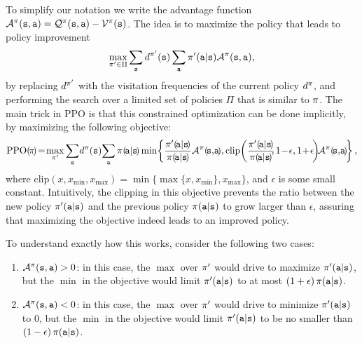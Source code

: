To simplify our notation we write the advantage function $\mathcal{A}^{\pi}({\tt s},{\tt a}) = \mathcal{Q}^{\pi}({\tt s},{\tt a}) - \mathcal{V}^{\pi}({\tt s})$. The idea is to maximize the policy that leads to policy improvement
\begin{equation*}
    \max_{\pi'\in \Pi}\sum_{{\tt s}} d^{\pi'}({\tt s}) \sum_{\tt a} \pi'({\tt a}|{\tt s})\mathcal{A}^{\pi}({\tt s},{\tt a}),
\end{equation*}
by replacing $d^{\pi'}$ with the visitation frequencies of the current policy $d^{\pi}$, and performing the search over a limited set of policies $\Pi$ that is similar to $\pi$. The main trick in PPO is that this constrained optimization can be done implicitly, by maximizing the following objective:
\begin{equation}\label{eq:PPO}
    \textrm{PPO}(\!\policy\!) \!=\! \max_{\!\policy'\!}\sum_{\!\state\!} \!\discdist^{\policy}(\state)\! \sum_{\!\action\!} \policy(\!\action|\state\!) \min \! \left\{\frac{\policy'(\!\action|\state\!)}{\policy(\!\action|\state\!)}\AdvValue^{\policy}(\!\state,\!\action\!),  \textrm{clip}\!\left(\frac{\policy'(\!\action|\state\!)}{\policy(\!\action|\state\!)}\!\!, 1 \!-\!\epsilon, 1\!+\!\epsilon\!\right)\!\!\AdvValue^{\policy}(\!\state,\!\action\!) \!\right\},
\end{equation}
where $\textrm{clip}\left(x , x_{\min}, x_{\max}\right) = \min\{\max\{x, x_{\min}\}, x_{\max}\}$,
and $\epsilon$ is some small constant. Intuitively, the clipping in this objective prevents the ratio between the new policy $\pi'({\tt a}|{\tt s})$ and the previous policy $\pi({\tt a}|{\tt s})$ to grow larger than $\epsilon$, assuring that maximizing the objective indeed leads to an improved policy.

To understand exactly how this works, consider the following two cases:
\begin{enumerate}
    \item $\mathcal{A}^{\pi}({\tt s},{\tt a}) > 0$: in this case, the $\max$ over $\pi'$ would drive to maximize $\pi'({\tt a}|{\tt s})$, but the $\min$ in the objective would limit $\pi'({\tt a}|{\tt s})$ to at most $\left( 1+\epsilon\right)\pi({\tt a}|{\tt s})$.
    \item $\mathcal{A}^{\pi}({\tt s},{\tt a}) < 0$: in this case, the $\max$ over $\pi'$ would drive to minimize $\pi'({\tt a}|{\tt s})$ to $0$, but the $\min$ in the objective would limit $\pi'({\tt a}|{\tt s})$ to be no smaller than $\left( 1-\epsilon\right)\pi({\tt a}|{\tt s})$.
\end{enumerate}

